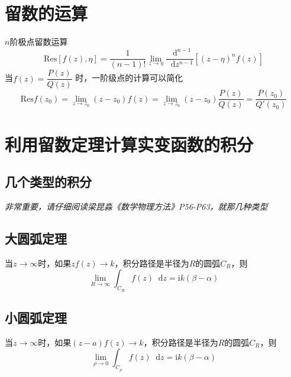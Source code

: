 \documentclass{article}
\newcommand*{\md}{\mathop{}\!\mathrm{d}}
\begin{document}
\section{留数的运算}
$n$阶极点留数运算
\begin{equation*}
  \mathrm{Res} \left[ f(z),\eta \right] = \dfrac{1}{(n - 1)!} \lim\limits_{z \rightarrow \eta} \dfrac{\md^{n-1}}{\md z^{n-1}} \left[ (z-\eta)^{n} f(z) \right]
\end{equation*}
当$f(z) = \dfrac{P(z)}{Q(z)} $ 时，一阶级点的计算可以简化
\begin{equation*}
  \mathrm{Res} f(z_{0}) = \lim\limits_{z \rightarrow z_{0}} (z - z_{0}) f(z) = \lim\limits_{z \rightarrow z_{0}} (z - z_{0}) \dfrac{P(z)}{Q(z)} =  \dfrac{P(z_{0})}{Q'(z_{0})} 
\end{equation*}

\section{利用留数定理计算实变函数的积分}

\subsection{几个类型的积分}



\emph{非常重要，请仔细阅读梁昆淼《数学物理方法》P56-P63，就那几种类型}

\subsection{大圆弧定理}

当$z \rightarrow \infty$时，如果$zf(z) \rightarrow k$，积分路径是半径为$R$的圆弧$C_{R}$，则
\begin{equation*}
  \lim\limits_{R \rightarrow \infty} \int_{C_{R}} f(z) \md z = \mathrm{i} k (\beta - \alpha)
\end{equation*}

\subsection{小圆弧定理}


当$z \rightarrow \infty$时，如果$(z-a)f(z) \rightarrow k$，积分路径是半径为$R$的圆弧$C_{R}$，则
\begin{equation*}
  \lim\limits_{\rho \rightarrow 0} \int_{C_{\rho}} f(z) \md z = \mathrm{i} k \left( \beta - \alpha  \right)
\end{equation*}
\end{document}
